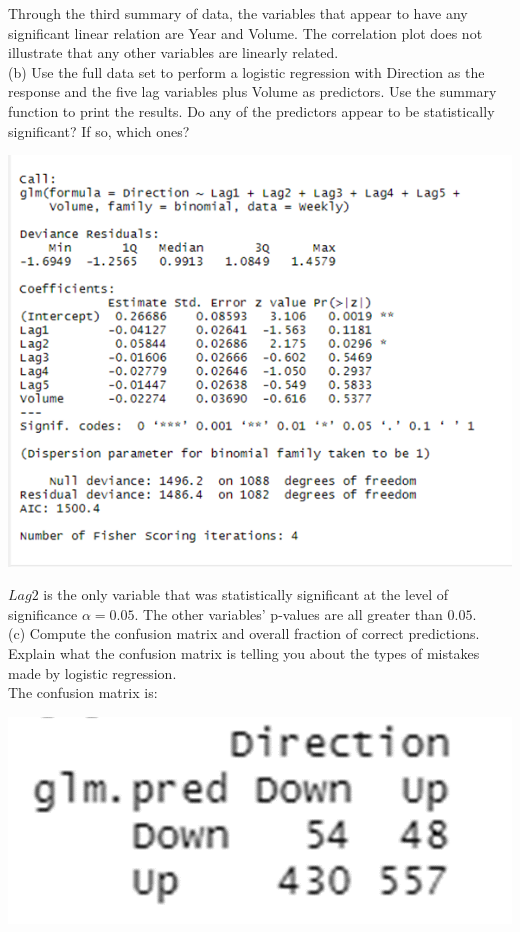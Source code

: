\documentclass{article}
\begin{document}
Through the third summary of data, the variables that appear to have any significant linear relation are Year and Volume. The correlation plot does not illustrate that any other variables are linearly related.\\
\linebreak (b) Use the full data set to perform a logistic regression with Direction as the response and the five lag variables plus Volume as predictors. Use the summary function to print the results. Do any of the predictors appear to be statistically significant? If so, which ones? \\
\begin{center}
\includegraphics[scale = 0.46]{2.13.b.png} \\
\end{center}
$Lag2$ is the only variable that was statistically significant at the level of significance $\alpha = 0.05$. The other variables' p-values are all greater than $0.05$. \\%
\linebreak (c) Compute the confusion matrix and overall fraction of correct predictions. Explain what the confusion matrix is telling you about the types of mistakes made by logistic regression. \\
The confusion matrix is: 
\begin{center}
\includegraphics[scale = 0.46]{2.13.c.png} \\
\end{center}
\end{document}

